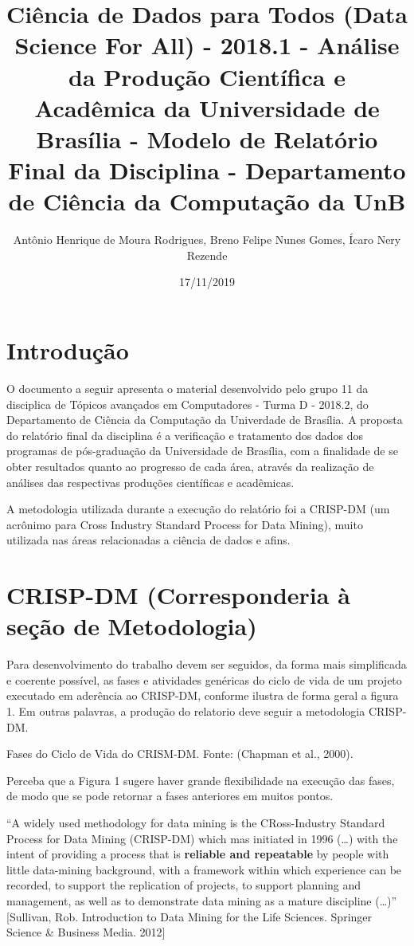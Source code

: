 \documentclass[]{article}
\title{Ciência de Dados para Todos (Data Science For All) - 2018.1 - Análise da
Produção Científica e Acadêmica da Universidade de Brasília - Modelo de
Relatório Final da Disciplina - Departamento de Ciência da Computação da
UnB}
\author{Antônio Henrique de Moura Rodrigues, Breno Felipe Nunes Gomes, Ícaro
Nery Rezende}
\date{17/11/2019}
\begin{document}
\maketitle

\section{Introdução}\label{introducao}

O documento a seguir apresenta o material desenvolvido pelo grupo 11 da
disciplica de Tópicos avançados em Computadores - Turma D - 2018.2, do
Departamento de Ciência da Computação da Univerdade de Brasília. A
proposta do relatório final da disciplina é a verificação e tratamento
dos dados dos programas de pós-graduação da Universidade de Brasília,
com a finalidade de se obter resultados quanto ao progresso de cada
área, através da realização de análises das respectivas produções
científicas e acadêmicas.

A metodologia utilizada durante a execução do relatório foi a CRISP-DM
(um acrônimo para Cross Industry Standard Process for Data Mining),
muito utilizada nas áreas relacionadas a ciência de dados e afins.

\section{CRISP-DM (Corresponderia à seção de
Metodologia)}\label{crisp-dm-corresponderia-a-secao-de-metodologia}

Para desenvolvimento do trabalho devem ser seguidos, da forma mais
simplificada e coerente possível, as fases e atividades genéricas do
ciclo de vida de um projeto executado em aderência ao CRISP-DM, conforme
ilustra de forma geral a figura 1. Em outras palavras, a produção do
relatorio deve seguir a metodologia CRISP-DM.

Fases do Ciclo de Vida do CRISM-DM. Fonte: (Chapman et al., 2000).

Perceba que a Figura 1 sugere haver grande flexibilidade na execução das
fases, de modo que se pode retornar a fases anteriores em muitos pontos.

``A widely used methodology for data mining is the CRoss-Industry
Standard Process for Data Mining (CRISP-DM) which mas initiated in 1996
(\ldots{}) with the intent of providing a process that is
\textbf{reliable and repeatable} by people with little data-mining
background, with a framework within which experience can be recorded, to
support the replication of projects, to support planning and management,
as well as to demonstrate data mining as a mature discipline
(\ldots{})'' {[}Sullivan, Rob. Introduction to Data Mining for the Life
Sciences. Springer Science \& Business Media. 2012{]}
\end{document}

